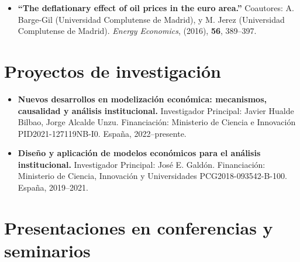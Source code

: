 \documentclass[11pt]{article}\usepackage[]{graphicx}\usepackage[usenames,dvipsnames]{xcolor}
\begin{document}
{\begin{itemize}
\item \textbf{``The deflationary effect of oil prices in the euro area.''} Coautores: A. Barge-Gil (Universidad Complutense de Madrid), y M. Jerez (Universidad Complutense de Madrid). \emph{Energy Economics}, (2016), \textbf{56}, 389--397.
\end{itemize}

\section{Proyectos de investigación} 

\begin{itemize}
  \item \textbf{Nuevos desarrollos en modelización económica: mecanismos, causalidad y análisis institucional.} Investigador Principal: Javier Hualde Bilbao, Jorge Alcalde Unzu. Financiación: Ministerio de Ciencia e Innovación PID2021-127119NB-I0. España, 2022--presente.

  \item \textbf{Diseño y aplicación de modelos económicos para el análisis institucional.} Investigador Principal: José E. Galdón. Financiación: Ministerio de Ciencia, Innovación y Universidades PCG2018-093542-B-100. España, 2019--2021.
\end{itemize}

\section{Presentaciones en conferencias y seminarios} 

}
\end{document}
